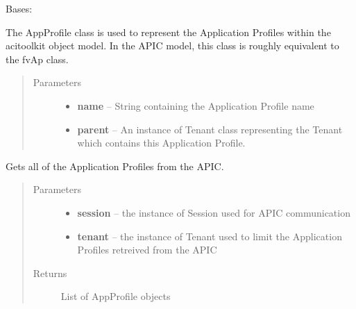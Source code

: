 \documentclass[letterpaper,10pt,english]{sphinxmanual}
\begin{document}
\begin{fulllineitems}
\label{acitoolkit:acitoolkit.AppProfile}
Bases: {\hyperref[acibaseobject:acibaseobject.BaseACIObject]{}}

The AppProfile class is used to represent the Application Profiles within
the acitoolkit object model.  In the APIC model, this class is roughly
equivalent to the fvAp class.
\begin{quote}\begin{description}
\item[{Parameters}] \leavevmode\begin{itemize}
\item {} 
\textbf{name} -- String containing the Application Profile name

\item {} 
\textbf{parent} -- An instance of Tenant class representing the Tenant        which contains this Application Profile.

\end{itemize}

\end{description}\end{quote}

\begin{fulllineitems}
\label{acitoolkit:acitoolkit.AppProfile.get}
Gets all of the Application Profiles from the APIC.
\begin{quote}\begin{description}
\item[{Parameters}] \leavevmode\begin{itemize}
\item {} 
\textbf{session} -- the instance of Session used for APIC communication

\item {} 
\textbf{tenant} -- the instance of Tenant used to limit the Application        Profiles retreived from the APIC

\end{itemize}

\item[{Returns}] \leavevmode
List of AppProfile objects

\end{description}\end{quote}


\end{fulllineitems}
\end{fulllineitems}
\end{document}
